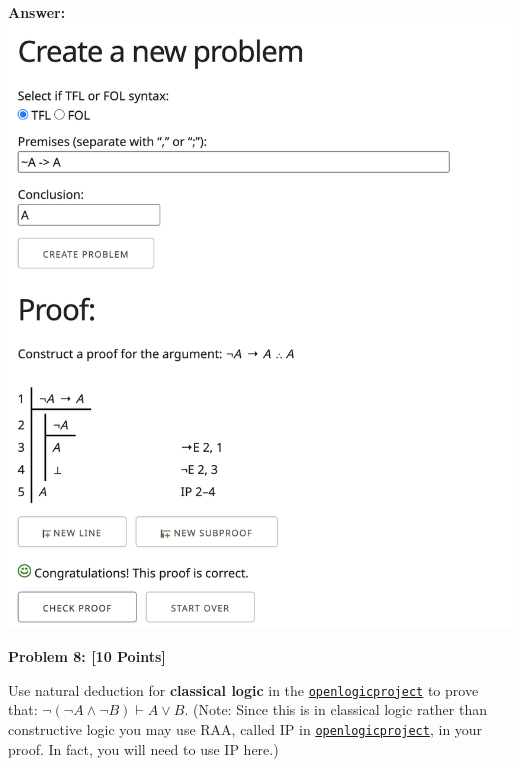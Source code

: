 \documentclass[12pt]{article}
\newcommand{\AND}{\wedge}
\newcommand{\OR}{\vee}
\newcommand{\TURN}{\vdash}
\newcommand{\Problem}[3]{\mbox{} \newline \noindent \textbf{\textbf{Problem #1: #2 [#3 Points] \\ }}}
\begin{document}
\bf{Answer:}
\includegraphics[scale = 0.4]{hw2pr7.png}

\Problem{8}{}{10}

Use natural deduction for \textbf{classical logic} in the \href{http://proofs.openlogicproject.org}{\texttt{openlogicproject}} to prove  that:  $\neg (\neg A \AND \neg B) \TURN A \OR B$.    (Note:  Since this is in classical logic rather than constructive logic you may use RAA, called IP in \href{http://proofs.openlogicproject.org}{\texttt{openlogicproject}}, in your proof.  In fact, you will need to use IP here.)
\end{document}
